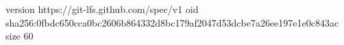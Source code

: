 version https://git-lfs.github.com/spec/v1
oid sha256:0fbdc650cca0bc2606b864332d8bc179af2047d53dcbe7a26ee197e1e0c843ac
size 60

